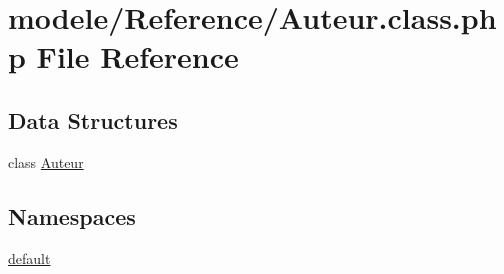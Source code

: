 \hypertarget{_auteur_8class_8php}{}\section{modele/\+Reference/\+Auteur.class.\+php File Reference}
\label{_auteur_8class_8php}
\subsection*{Data Structures}
\begin{DoxyCompactItemize}
\item 
class \hyperlink{class_auteur}{Auteur}
\end{DoxyCompactItemize}
\subsection*{Namespaces}
\begin{DoxyCompactItemize}
\item 
 \hyperlink{namespacedefault}{default}
\end{DoxyCompactItemize}
